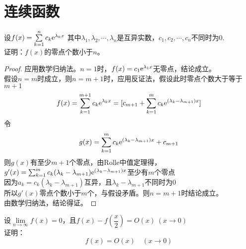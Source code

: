 \section{连续函数}

\begin{proposition}

    设$f(x) = \sum\limits_{k=1}^{n}{c_k\mathrm{e}^{\lambda_k x}}$
    其中$\lambda_1,\lambda_2,\cdots,\lambda_n$是互异实数，$c_1, c_2, \cdots , c_n$不同时为$0$.\\
    证明：$f(x)$的零点个数小于$n$。

\end{proposition}

\begin{proof}

    应用数学归纳法。$n=1$时，$f(x) = c_1 \mathrm{e}^{\lambda_1 x}$无零点，结论成立。\\
    假设$n = m$时成立，则$n = m + 1$时，应用反证法，假设此时零点个数大于等于$m+1$
    $$f(x) = \sum_{k=1}^{m+1}{c_k\mathrm{e}^{\lambda_k x}} = [c_{m+1} + \sum_{k=1}^{m}{c_k\mathrm{e}^{(\lambda_k - \lambda_{m+1}) x}}]$$
    令
    $$g(x) = \sum_{k=1}^{m}{c_k\mathrm{e}^{(\lambda_k - \lambda_{m+1}) x}} + c_{m+1}$$
    则$g(x)$有至少$m+1$个零点，由\textup{Rolle}中值定理得，$g'(x) = \sum_{k=1}^{m}{c_k (\lambda_k - \lambda_{m+1}) \mathrm{e}^{(\lambda_k - \lambda_{m+1}) x}}$至少有$m$个零点\\
    因为$a_k = c_k(\lambda_k - \lambda_{m+1})$互异，且$\lambda_k - \lambda_{m+1}$不同时为$0$\\
    所以$g'(x)$零点个数小于$m$个，与假设矛盾。则$n = m+1$时结论成立。\\
    由数学归纳法，结论得证。

\end{proof}

\begin{proposition}

    设$\lim\limits_{n\to\infty}{f(x)} = 0$，且$f(x) - f\left(\dfrac{x}{2}\right) = O(x) \ (x\to 0)$\\
    证明：
    $$f(x) = O(x) \quad (x \to 0)$$

\end{proposition}

